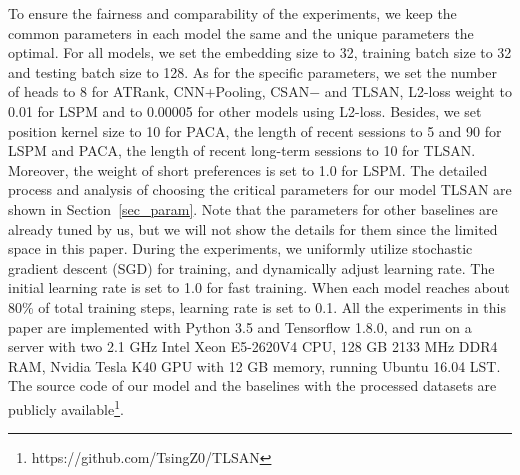 \documentclass[preprint,12pt]{elsarticle}
\newcommand{\tool}{TLSAN\xspace}
\begin{document}
\begin{sloppypar}
To ensure the fairness and comparability of the experiments, we keep the common parameters in each model the same and the unique parameters the optimal. For all models, we set the embedding size to 32, training batch size to 32 and testing batch size to 128. As for the specific parameters, we set the number of heads to 8 for ATRank, CNN+Pooling, CSAN$-$ and \tool, L2-loss weight to 0.01 for LSPM and to 0.00005 for other models using L2-loss. Besides, we set position kernel size to 10 for PACA, the length of recent sessions to 5 and 90 for LSPM and PACA, the length of recent long-term sessions to 10 for \tool. Moreover, the weight of short preferences is set to 1.0 for LSPM. The detailed process and analysis of choosing the critical parameters for our model \tool are shown in Section~\ref{sec_param}. Note that the parameters for other baselines are already tuned by us, but we will not show the details for them since the limited space in this paper. During the experiments, we uniformly utilize stochastic gradient descent (SGD) for training, and dynamically adjust learning rate. The initial learning rate is set to 1.0 for fast training. When each model reaches about 80\% of total training steps, learning rate is set to 0.1. All the experiments in this paper are implemented with Python 3.5 and Tensorflow 1.8.0, and run on a server with two 2.1 GHz Intel Xeon E5-2620V4 CPU, 128 GB 2133 MHz DDR4 RAM, Nvidia Tesla K40 GPU with 12 GB memory, running Ubuntu 16.04 LST. The source code of our model and the baselines with the processed datasets are publicly available\footnote{https://github.com/TsingZ0/TLSAN}.


\end{sloppypar}
\end{document}
